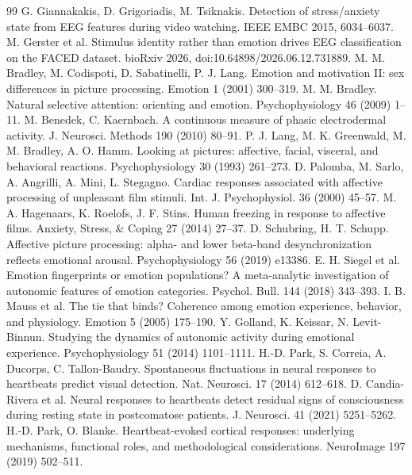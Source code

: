 \documentclass[10pt]{article}
\begin{document}
\begin{thebibliography}{99}\footnotesize\setlength{\itemsep}{1.2pt}
 G. Giannakakis, D. Grigoriadis, M. Tsiknakis. Detection of stress/anxiety state from EEG features during video watching. IEEE EMBC 2015, 6034--6037.
 M. Gerster et al. Stimulus identity rather than emotion drives EEG classification on the FACED dataset. bioRxiv 2026, doi:10.64898/2026.06.12.731889.
 M. M. Bradley, M. Codispoti, D. Sabatinelli, P. J. Lang. Emotion and motivation II: sex differences in picture processing. Emotion 1 (2001) 300--319.
 M. M. Bradley. Natural selective attention: orienting and emotion. Psychophysiology 46 (2009) 1--11.
 M. Benedek, C. Kaernbach. A continuous measure of phasic electrodermal activity. J. Neurosci. Methods 190 (2010) 80--91.
 P. J. Lang, M. K. Greenwald, M. M. Bradley, A. O. Hamm. Looking at pictures: affective, facial, visceral, and behavioral reactions. Psychophysiology 30 (1993) 261--273.
 D. Palomba, M. Sarlo, A. Angrilli, A. Mini, L. Stegagno. Cardiac responses associated with affective processing of unpleasant film stimuli. Int. J. Psychophysiol. 36 (2000) 45--57.
 M. A. Hagenaars, K. Roelofs, J. F. Stins. Human freezing in response to affective films. Anxiety, Stress, \& Coping 27 (2014) 27--37.
 D. Schubring, H. T. Schupp. Affective picture processing: alpha- and lower beta-band desynchronization reflects emotional arousal. Psychophysiology 56 (2019) e13386.
 E. H. Siegel et al. Emotion fingerprints or emotion populations? A meta-analytic investigation of autonomic features of emotion categories. Psychol. Bull. 144 (2018) 343--393.
 I. B. Mauss et al. The tie that binds? Coherence among emotion experience, behavior, and physiology. Emotion 5 (2005) 175--190.
 Y. Golland, K. Keissar, N. Levit-Binnun. Studying the dynamics of autonomic activity during emotional experience. Psychophysiology 51 (2014) 1101--1111.
 H.-D. Park, S. Correia, A. Ducorps, C. Tallon-Baudry. Spontaneous fluctuations in neural responses to heartbeats predict visual detection. Nat. Neurosci. 17 (2014) 612--618.
 D. Candia-Rivera et al. Neural responses to heartbeats detect residual signs of consciousness during resting state in postcomatose patients. J. Neurosci. 41 (2021) 5251--5262.
 H.-D. Park, O. Blanke. Heartbeat-evoked cortical responses: underlying mechanisms, functional roles, and methodological considerations. NeuroImage 197 (2019) 502--511.

\end{thebibliography}
\end{document}
